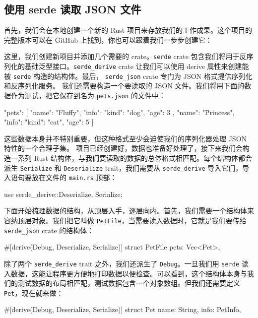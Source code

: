 \subsection{使用 serde 读取 JSON 文件}
\label{idx:idx_3111d65c}
\label{idx:idx_cd5b1033}
首先，我们会在本地创建一个新的 Rust 项目来存放我们的工作成果。这个项目的完整版本可以在 GitHub 上找到，你也可以跟着我们一步步创建它：
这里，我们创建新项目并添加几个需要的 crate。\texttt{serde} crate 包含我们将用于反序列化的基础泛型接口。\texttt{serde\_\allowbreak{}derive} crate 让我们可以使用 derive 属性来创建能被 \texttt{serde} 构造的结构体。最后，
\texttt{serde\_json} crate 专门为 JSON
格式提供序列化和反序列化服务。
我们还需要构造一个要读取的 JSON 文件。我们将用下面的数据作为测试，把它保存到名为 \texttt{pets.json} 的文件中：
\begin{codeboxdark}
{
  "pets": [
    {
      "name": "Fluffy",
      "info": { "kind": "dog", "age": 3 }
    },
    {
      "name": "Princess",
      "info": { "kind": "cat", "age": 5 }
    }
  ]
}
\end{codeboxdark}
这些数据本身并不特别重要，但这种格式至少会迫使我们的序列化器处理 JSON 特性的一个合理子集。
\label{idx:idx_7e0e07ab}
\label{idx:idx_16c438fb}
项目已经创建好，数据也准备好处理了，接下来我们会构造一系列 Rust 结构体，与我们要读取的数据的总体格式相匹配。每个结构体都会派生
\texttt{Serialize} 和 \texttt{Deserialize} trait，我们需要从 \texttt{serde\_\allowbreak{}derive} 导入它们，导入语句要放在文件的
\texttt{main.rs} 顶部：
\begin{codebox}[rust]
use serde_derive::{Deserialize, Serialize};
\end{codebox}
下面开始梳理数据的结构，从顶层入手，逐层向内。首先，我们需要一个结构体来容纳顶层对象。我们把它叫做 \texttt{PetFile}，当需要读入数据时，它就是我们要传给 \texttt{serde\_json} crate 的结构体：
\begin{codebox}[rust]
#[derive(Debug, Deserialize, Serialize)]
struct PetFile {
    pets: Vec<Pet>,
}
\end{codebox}
除了两个 \texttt{serde\_\allowbreak{}derive} trait 之外，我们还派生了 \texttt{Debug}。一旦我们用 \texttt{serde} 读入数据，这能让程序更方便地打印数据以便检查。可以看到，这个结构体本身与我们的测试数据的布局相匹配，测试数据包含一个对象数组。但我们还需要定义 \texttt{Pet}，现在就来做：
\begin{codebox}[rust]
#[derive(Debug, Deserialize, Serialize)]
struct Pet {
    name: String,
    info: PetInfo,
}
\end{codebox}
